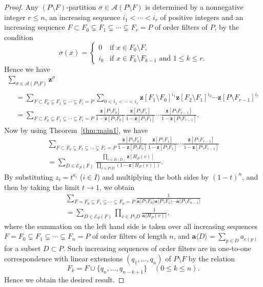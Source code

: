\documentclass[10pt]{amsart}
\theoremstyle{definition}
\theoremstyle{remark}
\newcommand\vectz{\boldsymbol{z}}
\newcommand\vecta{\boldsymbol{a}}
\newcommand\AP{\mathcal{A}}
\newcommand\EE{\mathcal{E}}
\begin{document}
\begin{proof}
Any $(P \setminus F)$-partition $\sigma \in \AP(P \setminus F)$ is determined by 
a nonnegative integer $r\leq n$, an increasing sequence $i_1 < \cdots < i_r$ of positive integers 
and an increasing sequence $F \subset F_0 \subsetneq F_1 \subsetneq \cdots \subsetneq F_r = P$ 
of order filters of $P$, by the condition
$$
\sigma(x)
 =
\begin{cases}
 0 &\text{if $x \in F_0 \setminus F$,} \\
 i_k &\text{if $x \in F_k \setminus F_{k-1}$ and $1 \le k \le r$.}
\end{cases}
$$
Hence we have
\begin{multline*}
\sum_{\sigma \in \AP(P \setminus F)} \vectz^\sigma
\\
\begin{aligned}
&
=
\sum_{F \subset F_0 \subsetneq F_1 \subsetneq \cdots \subsetneq F_r = P}
\sum_{0 < i_1 < \cdots < i_r}
 \vectz[F_1 \setminus F_0]^{i_1} \vectz[F_2 \setminus F_1]^{i_2} \cdots \vectz[P \setminus F_{r-1}]^{i_r}
\\
&
=
\sum_{F \subset F_0 \subsetneq F_1 \subsetneq \cdots \subsetneq F_r = P}
 \frac{ \vectz[P \setminus F_0] }
 { 1 - \vectz[P \setminus F_0] }
 \frac{ \vectz[P \setminus F_1] }
 { 1 - \vectz[P \setminus F_1] }
 \cdots
 \frac{ \vectz[P \setminus F_{r-1}] }
 { 1 - \vectz[P \setminus F_{r-1}] }.
\end{aligned}
\end{multline*}
Now by using Theorem~\ref{thm:main1}, we have
\begin{multline*}
\sum_{F \subset F_0 \subsetneq F_1 \subsetneq \cdots \subsetneq F_r = P}
 \frac{ \vectz[P \setminus F_0] }
 { 1 - \vectz[P \setminus F_0] }
 \frac{ \vectz[P \setminus F_1] }
 { 1 - \vectz[P \setminus F_1] }
 \cdots
 \frac{ \vectz[P \setminus F_{r-1}] }
 { 1 - \vectz[P \setminus F_{r-1}] }
\\
 =
\sum_{D \in \EE_P(F)}
 \frac{ \prod_{v \in B(D)} \vectz[H_P(v)] }
 { \prod_{v \in P \setminus D} ( 1 - \vectz[H_P(v)] ) }.
\end{multline*}
By substituting $z_i = t^{a_i}$ ($i \in I$) and multiplying the both sides by $(1-t)^n$, 
and then by taking the limit $t \to 1$, we obtain
\begin{multline*}
\sum_{F = F_0 \subsetneq F_1 \subsetneq \cdots \subsetneq F_n = P}
 \frac{ 1 }
 { \vecta \langle P \setminus F_0 \rangle \vecta \langle P \setminus F_1 \rangle 
 \cdots \vecta \langle P \setminus F_{n-1} \rangle
 }
\\
 =
\sum_{D \in \EE_P(F)}
 \prod_{v \in P \setminus D}
 \frac{ 1 }
 { \vecta \langle H_P(v) \rangle },
\end{multline*}
where the summation on the left hand side is taken over all increasing sequences 
$F = F_0 \subsetneq F_1 \subsetneq \cdots \subsetneq F_n = P$ of order filters of length $n$, 
and $\vecta \langle D \rangle = \sum_{p \in D} a_{c(p)}$ for a subset $D \subset P$.
Such increasing sequences of order filters are in one-to-one correspondence 
with linear extensions $(q_1, \ldots, q_n)$ of $P \setminus F$ by the relation
$$
F_k = F \cup \{ q_n, \ldots, q_{n-k+1} \}
\quad(0 \le k \le n).
$$
Hence we obtain the desired result.
\end{proof}
\end{document}

